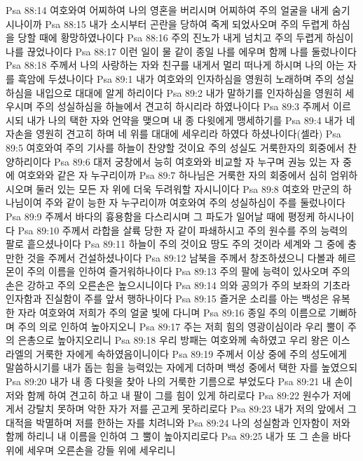 Psa 88:14  여호와여 어찌하여 나의 영혼을 버리시며 어찌하여 주의 얼굴을 내게 숨기시나이까
Psa 88:15  내가 소시부터 곤란을 당하여 죽게 되었사오며 주의 두렵게 하심을 당할 때에 황망하였나이다
Psa 88:16  주의 진노가 내게 넘치고 주의 두렵게 하심이 나를 끊었나이다
Psa 88:17  이런 일이 물 같이 종일 나를 에우며 함께 나를 둘렀나이다
Psa 88:18  주께서 나의 사랑하는 자와 친구를 내게서 멀리 떠나게 하시며 나의 아는 자를 흑암에 두셨나이다
Psa 89:1  내가 여호와의 인자하심을 영원히 노래하며 주의 성실하심을 내입으로 대대에 알게 하리이다
Psa 89:2  내가 말하기를 인자하심을 영원히 세우시며 주의 성실하심을 하늘에서 견고히 하시리라 하였나이다
Psa 89:3  주께서 이르시되 내가 나의 택한 자와 언약을 맺으며 내 종 다윗에게 맹세하기를
Psa 89:4  내가 네 자손을 영원히 견고히 하며 네 위를 대대에 세우리라 하였다 하셨나이다(셀라)
Psa 89:5  여호와여 주의 기사를 하늘이 찬양할 것이요 주의 성실도 거룩한자의 회중에서 찬양하리이다
Psa 89:6  대저 궁창에서 능히 여호와와 비교할 자 누구며 권능 있는 자 중에 여호와와 같은 자 누구리이까
Psa 89:7  하나님은 거룩한 자의 회중에서 심히 엄위하시오며 둘러 있는 모든 자 위에 더욱 두려워할 자시니이다
Psa 89:8  여호와 만군의 하나님이여 주와 같이 능한 자 누구리이까 여호와여 주의 성실하심이 주를 둘렀나이다
Psa 89:9  주께서 바다의 흉용함을 다스리시며 그 파도가 일어날 때에 평정케 하시나이다
Psa 89:10  주께서 라합을 살륙 당한 자 같이 파쇄하시고 주의 원수를 주의 능력의 팔로 흩으셨나이다
Psa 89:11  하늘이 주의 것이요 땅도 주의 것이라 세계와 그 중에 충만한 것을 주께서 건설하셨나이다
Psa 89:12  남북을 주께서 창조하셨으니 다볼과 헤르몬이 주의 이름을 인하여 즐거워하나이다
Psa 89:13  주의 팔에 능력이 있사오며 주의 손은 강하고 주의 오른손은 높으시니이다
Psa 89:14  의와 공의가 주의 보좌의 기초라 인자함과 진실함이 주를 앞서 행하나이다
Psa 89:15  즐거운 소리를 아는 백성은 유복한 자라 여호와여 저희가 주의 얼굴 빛에 다니며
Psa 89:16  종일 주의 이름으로 기뻐하며 주의 의로 인하여 높아지오니
Psa 89:17  주는 저희 힘의 영광이심이라 우리 뿔이 주의 은총으로 높아지오리니
Psa 89:18  우리 방패는 여호와께 속하였고 우리 왕은 이스라엘의 거룩한 자에게 속하였음이니이다
Psa 89:19  주께서 이상 중에 주의 성도에게 말씀하시기를 내가 돕는 힘을 능력있는 자에게 더하며 백성 중에서 택한 자를 높였으되
Psa 89:20  내가 내 종 다윗을 찾아 나의 거룩한 기름으로 부었도다
Psa 89:21  내 손이 저와 함께 하여 견고히 하고 내 팔이 그를 힘이 있게 하리로다
Psa 89:22  원수가 저에게서 강탈치 못하며 악한 자가 저를 곤고케 못하리로다
Psa 89:23  내가 저의 앞에서 그 대적을 박멸하며 저를 한하는 자를 치려니와
Psa 89:24  나의 성실함과 인자함이 저와 함께 하리니 내 이름을 인하여 그 뿔이 높아지리로다
Psa 89:25  내가 또 그 손을 바다 위에 세우며 오른손을 강들 위에 세우리니
